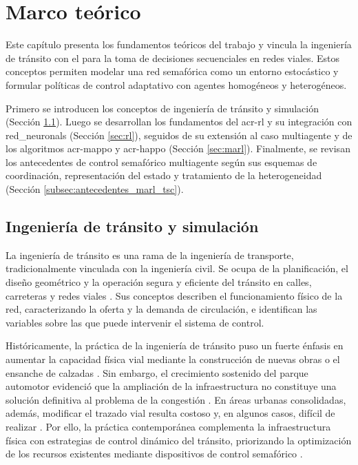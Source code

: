 \chapter{Marco teórico}\label{cap:marco_teorico}

Este capítulo presenta los fundamentos teóricos del trabajo y vincula la ingeniería de tránsito con el  para la toma de decisiones secuenciales en redes viales. Estos conceptos permiten modelar una red semafórica como un entorno estocástico y formular políticas de control adaptativo con agentes homogéneos y heterogéneos.

Primero se introducen los conceptos de ingeniería de tránsito y simulación (Sección \ref{sec:ingenieria_transito}). Luego se desarrollan los fundamentos del \acrshort{acr-rl} y su integración con \glspl{red_neuronal} (Sección \ref{sec:rl}), seguidos de su extensión al caso multiagente y de los algoritmos \acrshort{acr-mappo} y \acrshort{acr-happo} (Sección \ref{sec:marl}). Finalmente, se revisan los antecedentes de control semafórico multiagente según sus esquemas de coordinación, representación del estado y tratamiento de la heterogeneidad (Sección \ref{subsec:antecedentes_marl_tsc}).

\section{Ingeniería de tránsito y simulación}\label{sec:ingenieria_transito}

La ingeniería de tránsito es una rama de la ingeniería de transporte, tradicionalmente vinculada con la ingeniería civil. Se ocupa de la planificación, el diseño geométrico y la operación segura y eficiente del tránsito en calles, carreteras y redes viales \cite{ite_handbook,calymayor}. Sus conceptos describen el funcionamiento físico de la red, caracterizando la oferta y la demanda de circulación, e identifican las variables sobre las que puede intervenir el sistema de control.

Históricamente, la práctica de la ingeniería de tránsito puso un fuerte énfasis en aumentar la capacidad física vial mediante la construcción de nuevas obras o el ensanche de calzadas \cite{ite_handbook}. Sin embargo, el crecimiento sostenido del parque automotor evidenció que la ampliación de la infraestructura no constituye una solución definitiva al problema de la congestión \cite{duranton2011congestion}. En áreas urbanas consolidadas, además, modificar el trazado vial resulta costoso y, en algunos casos, difícil de realizar \cite{calymayor}. Por ello, la práctica contemporánea complementa la infraestructura física con estrategias de control dinámico del tránsito, priorizando la optimización de los recursos existentes mediante dispositivos de control semafórico \cite{tsitsokas2023twolayer}.

